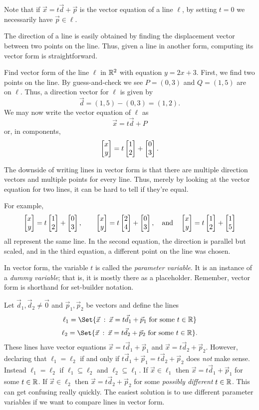 Note that if $\vec x=t\vec d+\vec p$ is the vector equation of a line $\ell$, by setting $t=0$
we necessarily have $\vec p\in\ell$.  

The direction of a line is easily obtained by finding the displacement vector between two points
on the line.  Thus, given a line in another form, computing its vector form is straightforward.
\begin{example}
	Find vector form of the line $\ell$ in $\mathbb{R}^2$ with equation $y=2x+3$.  First, we find two
	points on the line.  By guess-and-check we see $P=(0,3)$ and $Q=(1,5)$ are on $\ell$.
	Thus, a direction vector for $\ell$ is given by 
	\[
		\vec d = (1,5)-(0,3)=(1,2).
	\]
	We may now write the vector equation of $\ell$ as 
	\[
		\vec x=t\vec d+P
	\]
	or, in components,
	\[
		\mat{x\\y} = t\mat{1\\2}+\mat{0\\3}.
	\]
\end{example}

The downside of writing lines in vector form is that there are multiple direction vectors and multiple points
for every line.  Thus, merely by looking at the vector equation for two lines, it can be hard to tell if
they're equal.

For example,
\[
	\mat{x\\y} = t\mat{1\\2}+\mat{0\\3},\qquad
	\mat{x\\y} = t\mat{2\\4}+\mat{0\\3},\quad\text{and}\quad
	\mat{x\\y} = t\mat{1\\2}+\mat{1\\5}
\]
all represent the same line.  In the second equation, the direction is parallel but scaled, and in 
the third equation, a different point on the line was chosen.

In vector form, the variable $t$ is called the \emph{parameter variable}.  It is an instance of
a \emph{dummy variable}; that is, it is mostly there as a placeholder.  Remember, vector
form is shorthand for set-builder notation.  

Let $\vec d_1,\vec d_2\neq\vec 0$ and $\vec p_1,\vec p_2$ be vectors and define the lines
\[
	\ell_1=\Set{\vec x\given \vec x=t\vec d_1+\vec p_1\text{ for some }t\in\R}
\]
\[
	\ell_2=\Set{\vec x\given \vec x=t\vec d_2+\vec p_2\text{ for some }t\in\R}.
\]
These lines have vector equations $\vec x=t\vec d_1+\vec p_1$ and $\vec x=t\vec d_2+\vec p_2$.
However, declaring that $\ell_1=\ell_2$ if and only if $t\vec d_1+\vec p_1=t\vec d_2+\vec p_2$
does \emph{not} make sense.   Instead $\ell_1=\ell_2$ if $\ell_1\subseteq\ell_2$ and $\ell_2\subseteq\ell_1$.
If $\vec x\in\ell_1$ then $\vec x=t\vec d_1+\vec p_1$ for some $t\in\mathbb{R}$.  If $\vec x\in\ell_2$
then $\vec x=t\vec d_2+\vec p_2$ for some \emph{possibly different} $t\in \mathbb{R}$.  This can get
confusing really quickly.  The easiest solution is to use different parameter variables if
we want to compare lines in vector form.

